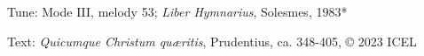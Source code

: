 

\begin{hymnsource}
Tune: Mode III, melody 53; \emph{Liber Hymnarius}, Solesmes, 1983*

Text: \emph{Quicumque Christum quæritis}, Prudentius, ca. 348-405, © 2023 ICEL
\end{hymnsource}
